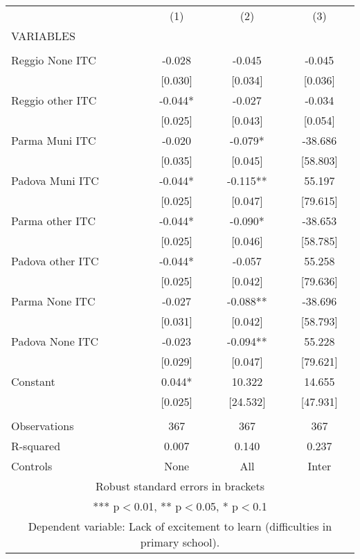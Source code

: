 \begin{tabular}{lccc} \hline
 & (1) & (2) & (3) \\
VARIABLES &  &  &  \\ \hline
 &  &  &  \\
Reggio None ITC & -0.028 & -0.045 & -0.045 \\
 & [0.030] & [0.034] & [0.036] \\
Reggio other ITC & -0.044* & -0.027 & -0.034 \\
 & [0.025] & [0.043] & [0.054] \\
Parma Muni ITC & -0.020 & -0.079* & -38.686 \\
 & [0.035] & [0.045] & [58.803] \\
Padova Muni ITC & -0.044* & -0.115** & 55.197 \\
 & [0.025] & [0.047] & [79.615] \\
Parma other ITC & -0.044* & -0.090* & -38.653 \\
 & [0.025] & [0.046] & [58.785] \\
Padova other ITC & -0.044* & -0.057 & 55.258 \\
 & [0.025] & [0.042] & [79.636] \\
Parma None ITC & -0.027 & -0.088** & -38.696 \\
 & [0.031] & [0.042] & [58.793] \\
Padova None ITC & -0.023 & -0.094** & 55.228 \\
 & [0.029] & [0.047] & [79.621] \\
Constant & 0.044* & 10.322 & 14.655 \\
 & [0.025] & [24.532] & [47.931] \\
 &  &  &  \\
Observations & 367 & 367 & 367 \\
R-squared & 0.007 & 0.140 & 0.237 \\
 Controls & None & All & Inter \\ \hline
\multicolumn{4}{c}{ Robust standard errors in brackets} \\
\multicolumn{4}{c}{ *** p$<$0.01, ** p$<$0.05, * p$<$0.1} \\
\multicolumn{4}{c}{ Dependent variable: Lack of excitement to learn (difficulties in primary school).} \\
\end{tabular}
